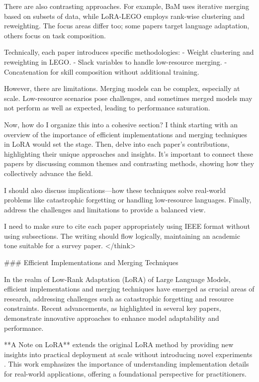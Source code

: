 \documentclass[conference]{IEEEtran}
\begin{document}
There are also contrasting approaches. For example, BaM uses iterative merging based on subsets of data, while LoRA-LEGO employs rank-wise clustering and reweighting. The focus areas differ too; some papers target language adaptation, others focus on task composition.

Technically, each paper introduces specific methodologies:
- Weight clustering and reweighting in LEGO.
- Slack variables to handle low-resource merging.
- Concatenation for skill composition without additional training.

However, there are limitations. Merging models can be complex, especially at scale. Low-resource scenarios pose challenges, and sometimes merged models may not perform as well as expected, leading to performance saturation.

Now, how do I organize this into a cohesive section? I think starting with an overview of the importance of efficient implementations and merging techniques in LoRA would set the stage. Then, delve into each paper's contributions, highlighting their unique approaches and insights. It's important to connect these papers by discussing common themes and contrasting methods, showing how they collectively advance the field.

I should also discuss implications—how these techniques solve real-world problems like catastrophic forgetting or handling low-resource languages. Finally, address the challenges and limitations to provide a balanced view.

I need to make sure to cite each paper appropriately using IEEE format without using subsections. The writing should flow logically, maintaining an academic tone suitable for a survey paper.
</think>

### Efficient Implementations and Merging Techniques

In the realm of Low-Rank Adaptation (LoRA) of Large Language Models, efficient implementations and merging techniques have emerged as crucial areas of research, addressing challenges such as catastrophic forgetting and resource constraints. Recent advancements, as highlighted in several key papers, demonstrate innovative approaches to enhance model adaptability and performance.

**A Note on LoRA** extends the original LoRA method by providing new insights into practical deployment at scale without introducing novel experiments \cite{b1}. This work emphasizes the importance of understanding implementation details for real-world applications, offering a foundational perspective for practitioners.
\end{document}

